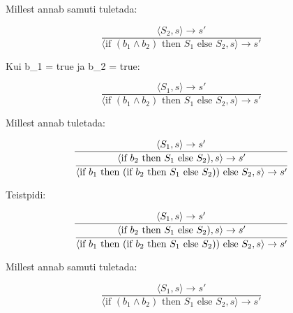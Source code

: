 Millest annab samuti tuletada:

\[
  \frac{
    \langle S_2, s \rangle \rightarrow s'
  }
  {
    \langle \text{if } (b_1 \wedge b_2) \text{ then } S_1 \text{ else }
    S_2, s \rangle \rightarrow s'
  }
\]


Kui b_1 = true \; ja \; b_2 = true:

\[
  \frac{
    \langle S_1, s \rangle \rightarrow s'
  }
  {
    \langle \text{if } (b_1 \wedge b_2) \text{ then } S_1 \text{ else }
    S_2, s \rangle \rightarrow s'
  }
\]

Millest annab tuletada:

\[
  \frac{
    \langle S_1, s \rangle \rightarrow s'
  }{
    \cfrac{
      \langle \text{if } b_2 \text{ then } S_1 \text{ else }
      S_2), s \rangle \rightarrow s'
    }{
      \langle \text{if } b_1 \text{ then } (\text{if } b_2 \text{ then } S_1 \text{ else }
      S_2)) \text{ else } S_2, s \rangle \rightarrow s'
    }
  }
\]

Teistpidi:

\[
  \frac{
    \langle S_1, s \rangle \rightarrow s'
  }{
    \cfrac{
      \langle \text{if } b_2 \text{ then } S_1 \text{ else }
      S_2), s \rangle \rightarrow s'
    }{
      \langle \text{if } b_1 \text{ then } (\text{if } b_2 \text{ then } S_1 \text{ else }
      S_2)) \text{ else } S_2, s \rangle \rightarrow s'
    }
  }
\]

Millest annab samuti tuletada:

\[
  \frac{
    \langle S_1, s \rangle \rightarrow s'
  }
  {
    \langle \text{if } (b_1 \wedge b_2) \text{ then } S_1 \text{ else }
    S_2, s \rangle \rightarrow s'
  }
\]


